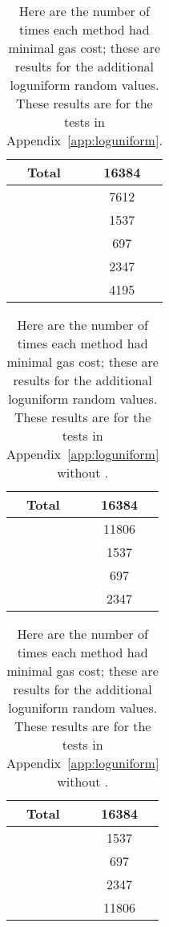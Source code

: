 \begin{table}[p]
\centering
\begin{tabular}{|c|S[table-format=5.0]|}
\hline
Total & 16384 \\
\hline
{} \UnrolledThree{} &  7612 \\
\WhileOne{}      &  1537 \\
\WhileTwo{}      &   697 \\
\WhileThree{}    &  2347 \\
 \Linear{}        &  4195 \\
\hline
\end{tabular}
\caption[Minimal Gas Costs Statistics]{Here are the number of times
    each method had minimal gas cost;
    these are results for the additional loguniform random values.
    These results are for the tests in Appendix~\ref{app:loguniform}.
    }
\label{table:minimal_gas_costs_er}
\end{table}

\begin{table}[p]
\centering
\begin{tabular}{|c|S[table-format=5.0]|}
\hline
Total & 16384 \\
\hline
{} \UnrolledThree{} &  11806 \\
\WhileOne{}      &  1537 \\
\WhileTwo{}      &   697 \\
\WhileThree{}    &  2347 \\
\hline
\end{tabular}
\caption[Minimal Gas Costs Statistics]{Here are the number of times
    each method had minimal gas cost;
    these are results for the additional loguniform random values.
    These results are for the tests in Appendix~\ref{app:loguniform}
    without \Linear{}.
    }
\label{table:minimal_gas_costs_er_no_linear}
\end{table}

\begin{table}[p]
\centering
\begin{tabular}{|c|S[table-format=5.0]|}
\hline
Total & 16384 \\
\hline
\WhileOne{}      &  1537 \\
\WhileTwo{}      &   697 \\
\WhileThree{}    &  2347 \\
 \Linear{} &  11806 \\
\hline
\end{tabular}
\caption[Minimal Gas Costs Statistics]{Here are the number of times
    each method had minimal gas cost;
    these are results for the additional loguniform random values.
    These results are for the tests in Appendix~\ref{app:loguniform}
    without \UnrolledThree{}.
    }
\label{table:minimal_gas_costs_er_no_unrolled}
\end{table}

